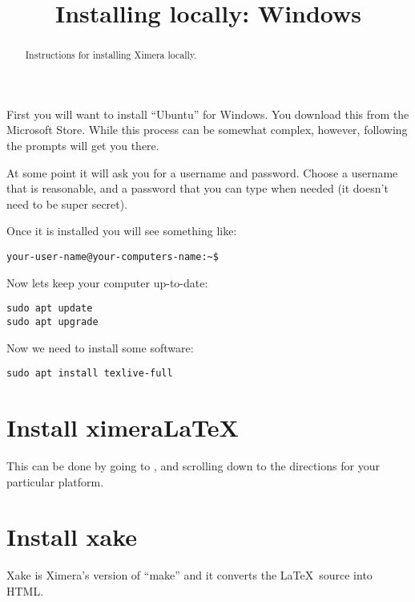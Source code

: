 \documentclass{ximera}
\title{Installing locally: Windows}
\begin{document}
\begin{abstract}
Instructions for installing Ximera locally.
\end{abstract}
\maketitle

First you will want to install ``Ubuntu'' for Windows. You download
this from the Microsoft Store. While this process can be somewhat
complex, however, following the prompts will get you there.

At some point it will ask you for a username and password. Choose a
username that is reasonable, and a password that you can type when
needed (it doesn't need to be super secret).

Once it is installed you will see something like:

\begin{verbatim}
your-user-name@your-computers-name:~$
\end{verbatim}

Now lets keep your computer up-to-date:

\begin{verbatim}
sudo apt update
sudo apt upgrade
\end{verbatim}

Now we need to install some software:

\begin{verbatim}
sudo apt install texlive-full 
\end{verbatim}



\section{Install ximeraLaTeX}

This can be done by going to , and scrolling
down to the directions for your particular platform.


\section{Install xake}

Xake is Ximera's version of ``make'' and it converts the
\LaTeX\ source into HTML.
\end{document}
